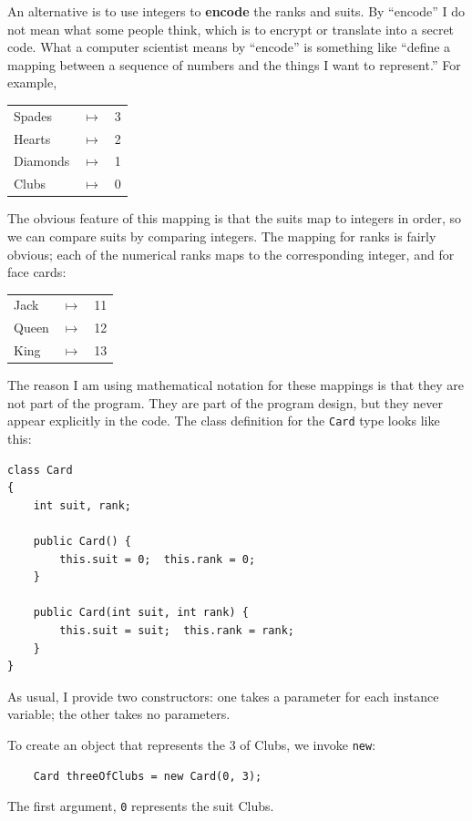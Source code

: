 \documentclass[12pt]{book}
\theoremstyle{exercise}
\begin{document}

An alternative is to use integers to {\bf encode} the ranks and
suits.  By ``encode'' I do not mean what some people think, which
is to encrypt or translate into a secret code.  What a computer
scientist means by ``encode'' is something like ``define a mapping
between a sequence of numbers and the things I want to represent.''
For example,

\begin{tabular}{l c l}
Spades & $\mapsto$ & 3 \\
Hearts & $\mapsto$ & 2 \\
Diamonds & $\mapsto$ & 1 \\
Clubs & $\mapsto$ & 0
\end{tabular}

The obvious feature of this mapping is that the suits map to
integers in order, so we can compare suits by comparing integers.
The mapping for ranks is fairly obvious; each of the numerical
ranks maps to the corresponding integer, and for face cards:

\begin{tabular}{l c l}
Jack & $\mapsto$ & 11 \\
Queen & $\mapsto$ & 12 \\
King & $\mapsto$ & 13 \\
\end{tabular}

The reason I am using mathematical notation for these mappings is
that they are not part of the program.  They are part of the
program design, but they never appear explicitly in the code.
The class definition for the {\tt Card} type looks like this:

\begin{lstlisting}
class Card
{
    int suit, rank;

    public Card() {
        this.suit = 0;  this.rank = 0;
    }

    public Card(int suit, int rank) {
        this.suit = suit;  this.rank = rank;
    }
}
\end{lstlisting}

As usual, I provide two constructors: one takes
a parameter for each instance variable; the other
takes no parameters.


To create an object that represents the 3 of Clubs, we invoke {\tt new}:

\begin{lstlisting}
    Card threeOfClubs = new Card(0, 3);
\end{lstlisting}
%
The first argument, {\tt 0} represents the suit Clubs.
\end{document}
